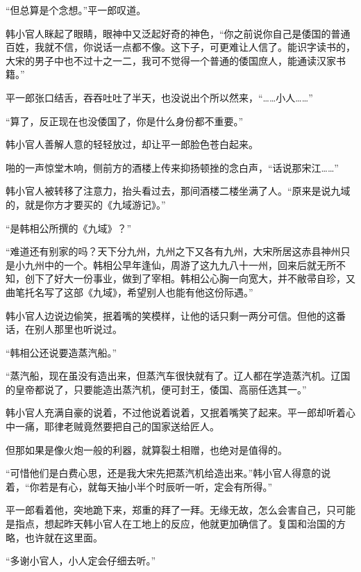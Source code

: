 “但总算是个念想。”平一郎叹道。

韩小官人眯起了眼睛，眼神中又泛起好奇的神色，“你之前说你自己是倭国的普通百姓，我就不信，你说话一点都不像。这下子，可更难让人信了。能识字读书的，大宋的男子中也不过十之一二，我可不觉得一个普通的倭国庶人，能通读汉家书籍。”

平一郎张口结舌，吞吞吐吐了半天，也没说出个所以然来，“……小人……”

“算了，反正现在也没倭国了，你是什么身份都不重要。”

韩小官人善解人意的轻轻放过，却让平一郎脸色苍白起来。

啪的一声惊堂木响，侧前方的酒楼上传来抑扬顿挫的念白声，“话说那宋江……”

韩小官人被转移了注意力，抬头看过去，那间酒楼二楼坐满了人。“原来是说九域的，就是你方才要买的《九域游记》。”

“是韩相公所撰的《九域》？”

“难道还有别家的吗？天下分九州，九州之下又各有九州，大宋所居这赤县神州只是小九州中的一个。韩相公早年逢仙，周游了这九九八十一州，回来后就无所不知，创下了好大一份事业，做到了宰相。韩相公心胸一向宽大，并不敝帚自珍，又曲笔托名写了这部《九域》，希望别人也能有他这份际遇。”

韩小官人边说边偷笑，抿着嘴的笑模样，让他的话只剩一两分可信。但他的这番话，在别人那里也听说过。

“韩相公还说要造蒸汽船。”

“蒸汽船，现在虽没有造出来，但蒸汽车很快就有了。辽人都在学造蒸汽机。辽国的皇帝都说了，只要能造出蒸汽机，便可封王，倭国、高丽任选其一。”

韩小官人充满自豪的说着，不过他说着说着，又抿着嘴笑了起来。平一郎却听着心中一痛，耶律老贼竟然要把自己的国家送给匠人。

但那如果是像火炮一般的利器，就算裂土相赠，也绝对是值得的。

“可惜他们是白费心思，还是我大宋先把蒸汽机给造出来。”韩小官人得意的说着，“你若是有心，就每天抽小半个时辰听一听，定会有所得。”

平一郎看着他，突地跪下来，郑重的拜了一拜。无缘无故，怎么会害自己，只可能是指点，想起昨天韩小官人在工地上的反应，他就更加确信了。复国和治国的方略，也许就在这里面。

“多谢小官人，小人定会仔细去听。”
